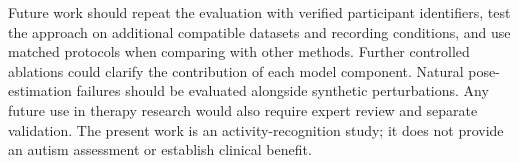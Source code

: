 Future work should repeat the evaluation with verified participant identifiers, test the approach on additional compatible datasets and recording conditions, and use matched protocols when comparing with other methods. Further controlled ablations could clarify the contribution of each model component. Natural pose-estimation failures should be evaluated alongside synthetic perturbations. Any future use in therapy research would also require expert review and separate validation. The present work is an activity-recognition study; it does not provide an autism assessment or establish clinical benefit.
